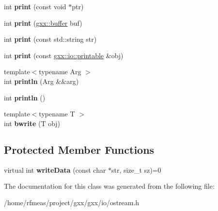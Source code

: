 \begin{DoxyCompactItemize}
\item 
int {\bfseries print} (const void $\ast$ptr)\hypertarget{classgxx_1_1io_1_1ostream_a26b3db4effdb4e28759421870bec3122}{}\label{classgxx_1_1io_1_1ostream_a26b3db4effdb4e28759421870bec3122}

\item 
int {\bfseries print} (\hyperlink{classgxx_1_1buffer}{gxx\+::buffer} buf)\hypertarget{classgxx_1_1io_1_1ostream_a1553d209967d56a2a51569b9bbdfa578}{}\label{classgxx_1_1io_1_1ostream_a1553d209967d56a2a51569b9bbdfa578}

\item 
int {\bfseries print} (const std\+::string str)\hypertarget{classgxx_1_1io_1_1ostream_a9e65aa5bc4fc3ec2b15e09a7b7ba226f}{}\label{classgxx_1_1io_1_1ostream_a9e65aa5bc4fc3ec2b15e09a7b7ba226f}

\item 
int {\bfseries print} (const \hyperlink{classgxx_1_1io_1_1printable}{gxx\+::io\+::printable} \&obj)\hypertarget{classgxx_1_1io_1_1ostream_ac3477295bc7dbd8782b4c89605497b02}{}\label{classgxx_1_1io_1_1ostream_ac3477295bc7dbd8782b4c89605497b02}

\item 
{\footnotesize template$<$typename Arg $>$ }\\int {\bfseries println} (Arg \&\&arg)\hypertarget{classgxx_1_1io_1_1ostream_af52d9608802372cad5216a3ebc433011}{}\label{classgxx_1_1io_1_1ostream_af52d9608802372cad5216a3ebc433011}

\item 
int {\bfseries println} ()\hypertarget{classgxx_1_1io_1_1ostream_a3b4ba9716ae421bccbeeeec0ff831f8a}{}\label{classgxx_1_1io_1_1ostream_a3b4ba9716ae421bccbeeeec0ff831f8a}

\item 
{\footnotesize template$<$typename T $>$ }\\int {\bfseries bwrite} (T obj)\hypertarget{classgxx_1_1io_1_1ostream_a926d36884c5bd6d2fedce4c32f92a279}{}\label{classgxx_1_1io_1_1ostream_a926d36884c5bd6d2fedce4c32f92a279}

\end{DoxyCompactItemize}
\subsection*{Protected Member Functions}
\begin{DoxyCompactItemize}
\item 
virtual int {\bfseries write\+Data} (const char $\ast$str, size\+\_\+t sz)=0\hypertarget{classgxx_1_1io_1_1ostream_a5b65b75fde45c7abb3ea7a9df5af0309}{}\label{classgxx_1_1io_1_1ostream_a5b65b75fde45c7abb3ea7a9df5af0309}

\end{DoxyCompactItemize}


The documentation for this class was generated from the following file\+:\begin{DoxyCompactItemize}
\item 
/home/rfmeas/project/gxx/gxx/io/ostream.\+h\end{DoxyCompactItemize}
